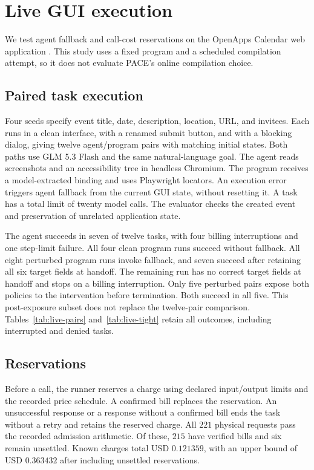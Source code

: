 \section{Live GUI execution}
\label{app:live}
\label{sec:live}

We test agent fallback and call-cost reservations on the OpenApps Calendar web application \citep{ullrich2025openapps}.
This study uses a fixed program and a scheduled compilation attempt, so it does not evaluate PACE's online compilation choice.

\subsection{Paired task execution}
Four seeds specify event title, date, description, location, URL, and invitees.
Each runs in a clean interface, with a renamed submit button, and with a blocking dialog, giving twelve agent/program pairs with matching initial states.
Both paths use GLM 5.3 Flash and the same natural-language goal.
The agent reads screenshots and an accessibility tree in headless Chromium.
The program receives a model-extracted binding and uses Playwright locators.
An execution error triggers agent fallback from the current GUI state, without resetting it.
A task has a total limit of twenty model calls.
The evaluator checks the created event and preservation of unrelated application state.



The agent succeeds in seven of twelve tasks, with four billing interruptions and one step-limit failure.
All four clean program runs succeed without fallback.
All eight perturbed program runs invoke fallback, and seven succeed after retaining all six target fields at handoff.
The remaining run has no correct target fields at handoff and stops on a billing interruption.
Only five perturbed pairs expose both policies to the intervention before termination.
Both succeed in all five.
This post-exposure subset does not replace the twelve-pair comparison.
Tables~\ref{tab:live-pairs} and~\ref{tab:live-tight} retain all outcomes, including interrupted and denied tasks.



\subsection{Reservations}
Before a call, the runner reserves a charge using declared input/output limits and the recorded price schedule.
A confirmed bill replaces the reservation.
An unsuccessful response or a response without a confirmed bill ends the task without a retry and retains the reserved charge.
All $221$ physical requests pass the recorded admission arithmetic.
Of these, $215$ have verified bills and six remain unsettled.
Known charges total USD $0.121359$, with an upper bound of USD $0.363432$ after including unsettled reservations.

